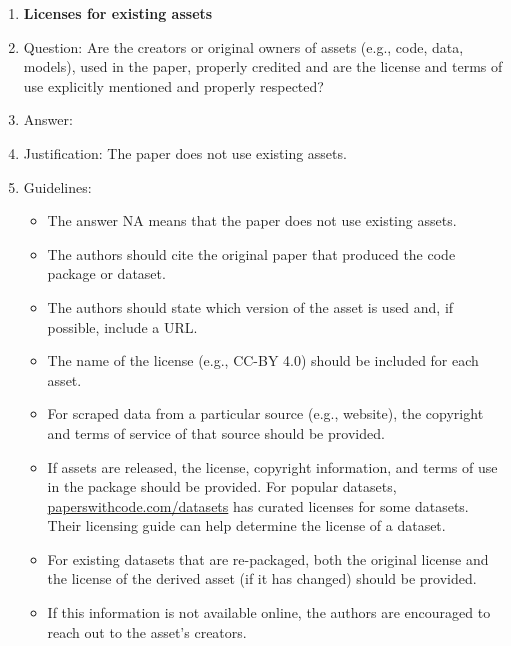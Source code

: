 \documentclass{article}
\begin{document}
{\begin{enumerate}
\item {\bf Licenses for existing assets}
    \item[] Question: Are the creators or original owners of assets (e.g., code, data, models), used in the paper, properly credited and are the license and terms of use explicitly mentioned and properly respected?
    \item[] Answer: \answerNA{} %
    \item[] Justification: The paper does not use existing assets.
    \item[] Guidelines:
    \begin{itemize}
        \item The answer NA means that the paper does not use existing assets.
        \item The authors should cite the original paper that produced the code package or dataset.
        \item The authors should state which version of the asset is used and, if possible, include a URL.
        \item The name of the license (e.g., CC-BY 4.0) should be included for each asset.
        \item For scraped data from a particular source (e.g., website), the copyright and terms of service of that source should be provided.
        \item If assets are released, the license, copyright information, and terms of use in the package should be provided. For popular datasets, \url{paperswithcode.com/datasets} has curated licenses for some datasets. Their licensing guide can help determine the license of a dataset.
        \item For existing datasets that are re-packaged, both the original license and the license of the derived asset (if it has changed) should be provided.
        \item If this information is not available online, the authors are encouraged to reach out to the asset's creators.
    \end{itemize}


\end{enumerate}}
\end{document}
